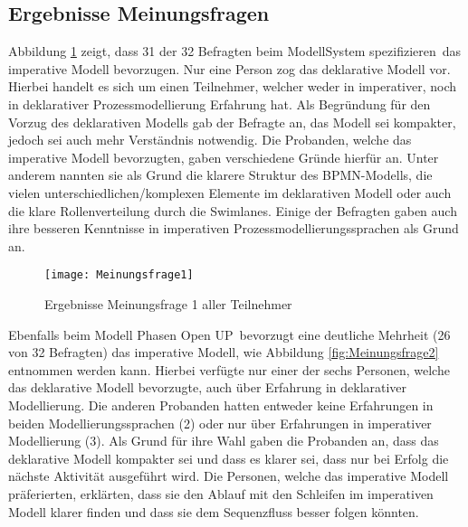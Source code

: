\subsection{Ergebnisse Meinungsfragen}

Abbildung \ref{fig:Meinungsfrage1} zeigt, dass 31 der 32 Befragten beim Modell\grqq System spezifizieren\grqq \ das imperative Modell bevorzugen. Nur eine Person zog das deklarative Modell vor. Hierbei handelt es sich um einen Teilnehmer, welcher weder in imperativer, noch in deklarativer Prozessmodellierung Erfahrung hat. Als Begründung für den Vorzug des deklarativen Modells gab der Befragte an, das Modell sei kompakter, jedoch sei auch mehr Verständnis notwendig.\newline
Die Probanden, welche das imperative Modell bevorzugten, gaben verschiedene Gründe hierfür an. Unter anderem nannten sie als Grund die klarere Struktur des BPMN-Modells, die vielen unterschiedlichen/komplexen Elemente im deklarativen Modell oder auch die klare Rollenverteilung durch die Swimlanes. Einige der Befragten gaben auch ihre besseren Kenntnisse in imperativen Prozessmodellierungssprachen als Grund an.\newline

\begin{figure}[htp]
\begin{center}
  \texttt{[image: Meinungsfrage1]} %
  \caption{Ergebnisse Meinungsfrage 1 aller Teilnehmer}
  \label{fig:Meinungsfrage1}
\end{center}
\end{figure}

Ebenfalls beim Modell \grqq Phasen Open UP\grqq \ bevorzugt eine deutliche Mehrheit (26 von 32 Befragten) das imperative Modell, wie Abbildung \ref{fig:Meinungsfrage2} entnommen werden kann. \newline
Hierbei verfügte nur einer der sechs Personen, welche das deklarative Modell bevorzugte, auch über Erfahrung in deklarativer Modellierung. Die anderen Probanden hatten entweder keine Erfahrungen in beiden Modellierungssprachen (2) oder nur über Erfahrungen in imperativer Modellierung (3). Als Grund für ihre Wahl gaben die Probanden an, dass das deklarative Modell kompakter sei und dass es klarer sei, dass nur bei Erfolg die nächste Aktivität ausgeführt wird.\newline
Die Personen, welche das imperative Modell präferierten, erklärten, dass sie den Ablauf mit den Schleifen im imperativen Modell klarer finden und dass sie dem Sequenzfluss besser folgen könnten.\newline


